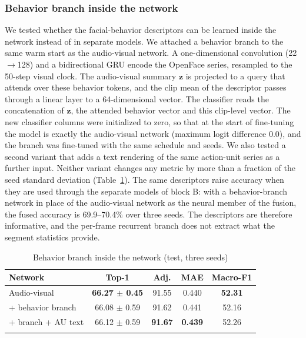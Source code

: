 \documentclass[pdflatex,iicol,sn-basic]{sn-jnl}
\begin{document}
\subsubsection{Behavior branch inside the network}\label{sec:abl_branch}

We tested whether the facial-behavior descriptors can be learned inside the network instead of in separate models. We attached a behavior branch to the same warm start as the audio-visual network. A one-dimensional convolution (22$\to$128) and a bidirectional GRU encode the OpenFace series, resampled to the 50-step visual clock. The audio-visual summary $\mathbf{z}$ is projected to a query that attends over these behavior tokens, and the clip mean of the descriptor passes through a linear layer to a 64-dimensional vector. The classifier reads the concatenation of $\mathbf{z}$, the attended behavior vector and this clip-level vector. The new classifier columns were initialized to zero, so that at the start of fine-tuning the model is exactly the audio-visual network (maximum logit difference 0.0), and the branch was fine-tuned with the same schedule and seeds. We also tested a second variant that adds a text rendering of the same action-unit series as a further input. Neither variant changes any metric by more than a fraction of the seed standard deviation (Table~\ref{tab:branch}). The same descriptors raise accuracy when they are used through the separate models of block B: with a behavior-branch network in place of the audio-visual network as the neural member of the fusion, the fused accuracy is 69.9--70.4\% over three seeds. The descriptors are therefore informative, and the per-frame recurrent branch does not extract what the segment statistics provide.

\begin{table}[t]
\caption{Behavior branch inside the network (test, three seeds)}\label{tab:branch}
\begin{tabular*}{\textwidth}{@{\extracolsep\fill}lcccc}
\toprule
Network & Top-1 & Adj. & MAE & Macro-F1\\
\midrule
Audio-visual & \textbf{66.27 $\pm$ 0.45} & 91.55 & 0.440 & \textbf{52.31}\\
+ behavior branch & 66.08 $\pm$ 0.59 & 91.62 & 0.441 & 52.16\\
+ branch + AU text & 66.12 $\pm$ 0.59 & \textbf{91.67} & \textbf{0.439} & 52.26\\
\botrule
\end{tabular*}
\end{table}
\end{document}

